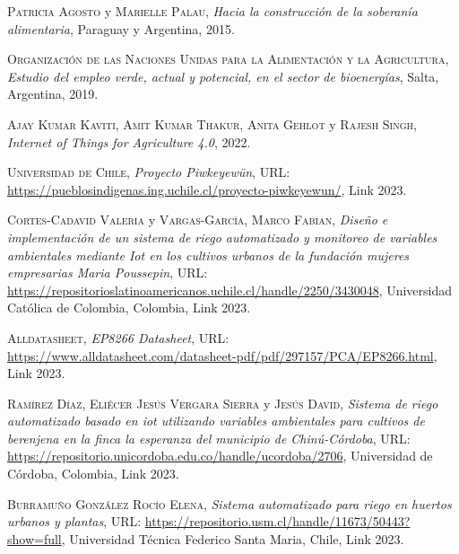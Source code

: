 \begin{thebibliography}{X}

 \textsc{Patricia Agosto} y \textsc{Marielle Palau},
\textit{Hacia la construcción de la soberanía alimentaria}, Paraguay y Argentina, 2015.

 \textsc{Organización de las Naciones Unidas para la Alimentación y la Agricultura}, \textit{Estudio del empleo verde, actual y potencial, en el sector de bioenergías}, Salta, Argentina, 2019.

 \textsc{Ajay Kumar Kaviti}, \textsc{Amit Kumar Thakur}, \textsc{Anita Gehlot} y \textsc{Rajesh Singh}, \textit{Internet of Things for Agriculture 4.0}, 2022.

 \textsc{Universidad de Chile},
\textit{Proyecto Piwkeyewün}, URL: \url{https://pueblosindigenas.ing.uchile.cl/proyecto-piwkeyewun/}, Link 2023.

 \textsc{Cortes-Cadavid Valeria} y \textsc{Vargas-García, Marco Fabian},
\textit{Diseño e implementación de un sistema de riego automatizado y monitoreo de variables ambientales mediante Iot en los cultivos urbanos de la fundación mujeres empresarias Maria Poussepin},  URL: \url{https://repositorioslatinoamericanos.uchile.cl/handle/2250/3430048}, Universidad Católica de Colombia, Colombia, Link 2023.

 \textsc{Alldatasheet}, \textit{EP8266 Datasheet},  URL: \url{https://www.alldatasheet.com/datasheet-pdf/pdf/297157/PCA/EP8266.html}, Link 2023.

 \textsc{Ramírez Díaz}, \textsc{Eliécer Jesús Vergara Sierra} y \textsc{Jesús David}, \textit{Sistema de riego automatizado basado en iot utilizando variables ambientales para cultivos de berenjena en la finca la esperanza del municipio de Chinú-Córdoba},  URL: \url{https://repositorio.unicordoba.edu.co/handle/ucordoba/2706}, Universidad de Córdoba, Colombia, Link 2023.

 \textsc{Burramuño González Rocío Elena},
\textit{Sistema automatizado para riego en huertos urbanos y plantas},  URL: \url{https://repositorio.usm.cl/handle/11673/50443?show=full}, Universidad Técnica Federico Santa Maria, Chile, Link 2023.

\end{thebibliography}